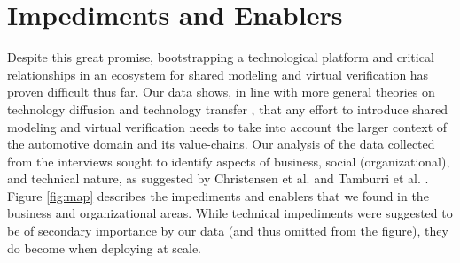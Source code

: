 \section{Impediments and Enablers}\label{sec:impediments_and_enablers}

Despite this great promise, bootstrapping a technological platform and critical relationships in an ecosystem for shared modeling and virtual verification has proven difficult thus far.
Our data shows, in line with more general theories on technology diffusion \cite{rogers2010diffusion} and technology transfer \cite{gorschek2006model}, that any effort to introduce shared modeling and virtual verification needs to take into account the larger context of the automotive domain and its value-chains. 
Our analysis of the data collected from the interviews sought to identify aspects of business, social (organizational), and technical nature, as suggested by Christensen et al. \cite{christensen2014analysis} and Tamburri et al. \cite{tamburri2013uncovering} . 
Figure \ref{fig:map} describes the impediments and enablers that we found in the business and organizational areas. 
While technical impediments were suggested to be of secondary importance by our data (and thus omitted from the figure), they do become  when deploying at scale.





